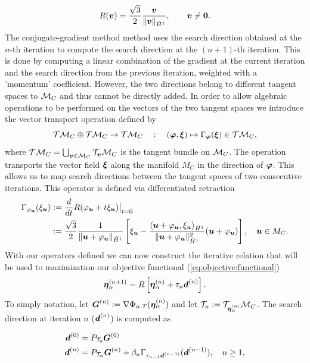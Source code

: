 \begin{equation}\label{eq:retraction:operator}
R(\boldsymbol v) = \frac{\sqrt{3}}{2}\frac{\boldsymbol v}{\|\boldsymbol v\|_{\dot{H}^1}}, \qquad \boldsymbol v\neq \boldsymbol 0.
\end{equation}
The conjugate-gradient method method uses the search direction obtained at the $n$-th iteration to compute the search direction at the $(n+1)$-th iteration. This is done by computing a linear combination of the gradient at the current iteration and the search direction from the previous iteration, weighted with a 'momentum' coefficient. However, the two directions belong to different tangent spaces to $\mathcal{M}_C$ and thus cannot be directly added. In order to allow algebraic operations to be performed on the vectors of the two tangent spaces we introduce the vector transport operation defined by \cite{absil_optimization_2008}
$$\mathcal{T}\mathcal{M}_C \oplus \mathcal{T}\mathcal{M}_C \rightarrow \mathcal{T}\mathcal{M}_C \quad:\quad (\boldsymbol \varphi,\boldsymbol \xi)\mapsto \Gamma_{\boldsymbol \varphi}(\boldsymbol \xi)\in \mathcal{T}\mathcal{M}_C, $$
where $\mathcal{T}\mathcal{M}_C = \bigcup_{\boldsymbol v\in\mathcal{M}_C}\mathcal{T}_{\boldsymbol v}\mathcal{M}_C$ is the tangent bundle on $\mathcal{M}_C$. The operation transports the vector field $\boldsymbol \xi$ along the manifold $M_C$ in the direction of $\boldsymbol \varphi$. This allows us to map search directions between the tangent spaces of two consecutive iterations. This operator is defined via differentiated retraction
\begin{subequations}\label{eq:vector:transport}
\begin{align}
\Gamma_{\varphi_{\boldsymbol u}}(\xi_{\boldsymbol u}) &:= \frac{d}{dt} R(\varphi_{\boldsymbol u} + t\xi_{\boldsymbol u})\big|_{t=0}\\
&:= \frac{\sqrt{3}}{2} \frac{1}{\|\boldsymbol u+\varphi_{\boldsymbol u}\|_{\dot{H}^1}} \left[\xi_{\boldsymbol u} - \frac{\left\langle \boldsymbol u+\varphi_{\boldsymbol u},\xi_{\boldsymbol u}\right\rangle_{\dot{H}^1}}{\|\boldsymbol u + \varphi_{\boldsymbol u}\|_{\dot{H}^1}^2}(\boldsymbol u + \varphi_{\boldsymbol u})\right],\quad \boldsymbol u\in M_C.
\end{align}
\end{subequations}
\noindent With our operators defined we can now construct the iterative relation that will be used to maximization our objective functional (\ref{eq:objective:functional})
\begin{equation}\label{eq:iteration}
{\boldsymbol \eta_\alpha^{(n+1)}} = R\left[{\boldsymbol \eta_\alpha^{(n)}} + \tau_n \boldsymbol d^{(n)}\right].
\end{equation}
To simply notation, let $\boldsymbol G^{(n)} := \nabla\Phi_{\alpha,T}({\boldsymbol \eta_\alpha^{(n)}})$ and let $\mathcal{T}_n := \mathcal{T}_{{\boldsymbol \eta_\alpha^{(n)}}}\mathcal{M}_C$. The search direction at iteration $n$ ($\boldsymbol d^{(n)}$) is computed as
\begin{small}
\begin{subequations}\label{eq:search:direction}
\begin{align*}
\boldsymbol d^{(0)} &= P_{\mathcal{T}_0}\boldsymbol G^{(0)} \\
\boldsymbol d^{(n)} &= P_{\mathcal{T}_n}\boldsymbol G^{(n)} + \beta_n\Gamma_{\tau_{n-1}\boldsymbol d^{(n-1)}}(\boldsymbol d^{(n-1)}), \quad n\geq 1,
\end{align*}
\end{subequations}
\end{small}
